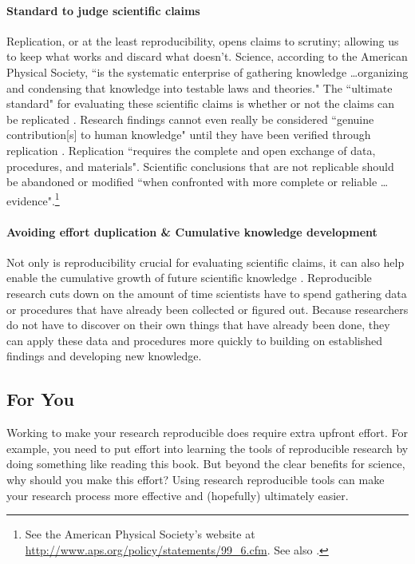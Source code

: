 \paragraph{Standard to judge scientific claims} 
Replication, or at the least reproducibility, opens claims to scrutiny; allowing us to keep what works and discard what doesn't. Science, according to the American Physical Society, ``is the systematic enterprise of gathering knowledge \ldots organizing and condensing that knowledge into testable laws and theories." The ``ultimate standard" for evaluating these scientific claims is whether or not the claims can be replicated \cite[]{Peng2011,Kelly2006}. Research findings cannot even really be considered ``genuine contribution[s] to human knowledge" until they have been verified through replication \cite[38]{Stodden2009}. Replication ``requires the complete and open exchange of data, procedures, and materials". Scientific conclusions that are not replicable should be abandoned or modified ``when confronted with more complete or reliable \ldots evidence".\footnote{See the American Physical Society's website at \url{http://www.aps.org/policy/statements/99_6.cfm}. See also \cite{Fomel2009}.} 

\paragraph{Avoiding effort duplication \& Cumulative knowledge development} 
Not only is reproducibility crucial for evaluating scientific claims, it can also help enable the cumulative growth of future scientific knowledge \cite[]{Kelly2006,King1995}. Reproducible research cuts down on the amount of time scientists have to spend gathering data or procedures that have already been collected or figured out. Because researchers do not have to discover on their own things that have already been done, they can apply these data and procedures more quickly to building on established findings and developing new knowledge.

\subsection{For You}

Working to make your research reproducible does require extra upfront effort. For example, you need to put effort into learning the tools of reproducible research by doing something like reading this book. But beyond the clear benefits for science, why should you make this effort? Using research reproducible tools can make your research process more effective and (hopefully) ultimately easier.

